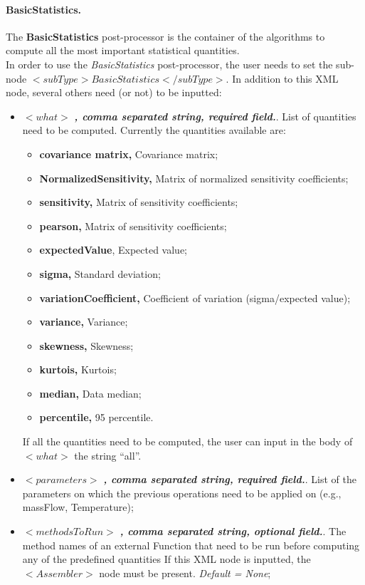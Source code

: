 \paragraph{BasicStatistics.}
\label{BasicStatistics}
The \textbf{BasicStatistics} post-processor is the container of the algorithms to compute all the most important statistical quantities. 
\\In order to use the   \textit{BasicStatistics} post-processor, the user needs to set the sub-node $<subType>BasicStatistics</subType>$. In addition to this XML node, several others need (or not) to be inputted:
\begin{itemize}
\item $<what>$ \textbf{\textit{, comma separated string, required field.}}.  List of quantities need to be computed. Currently the quantities available are:
\begin{itemize}
   \item \textbf{covariance matrix,} Covariance matrix;
   \item \textbf{NormalizedSensitivity,} Matrix of normalized sensitivity coefficients;
   \item \textbf{sensitivity,} Matrix of sensitivity coefficients;
   \item \textbf{pearson,} Matrix of sensitivity coefficients;
   \item \textbf{expectedValue}, Expected value;
   \item \textbf{sigma,} Standard deviation;
   \item \textbf{variationCoefficient,} Coefficient of variation (sigma/expected value);
   \item \textbf{variance,} Variance;
   \item \textbf{skewness,} Skewness;
   \item \textbf{kurtois,} Kurtois;
   \item \textbf{median,} Data median;
   \item \textbf{percentile,} 95 percentile.
\end{itemize}
If all the quantities need to be computed, the user can input in the body of $<what>$ the string ``all''.
\item $<parameters>$ \textbf{\textit{, comma separated string, required field.}}. List of the parameters on which the previous operations need to be applied on (e.g., massFlow, Temperature);
\item $<methodsToRun>$ \textbf{\textit{, comma separated string, optional field.}}.  The method names of an external Function that need to be run before computing any of the predefined quantities If this XML node is inputted, the $<Assembler>$ node must be present. \textit{Default = None};

\end{itemize}
